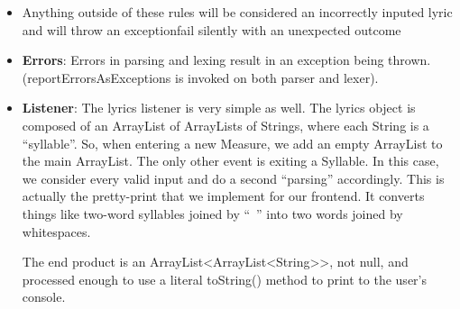 \documentclass[12pt]{book}
\begin{document}
\begin{itemize}
\item Anything outside of these rules will be considered an incorrectly inputed
lyric and will throw an exception\/fail silently with an unexpected outcome

\item {\bf Errors}: Errors in parsing and lexing result in an exception being thrown. (reportErrorsAsExceptions is invoked on both parser and lexer).

\item {\bf Listener}: The lyrics listener is very simple as well. The lyrics object is composed of an ArrayList of ArrayLists of Strings, where each String is a ``syllable''. So, when entering a new Measure, we add an empty ArrayList to the main ArrayList. The only other event is exiting a Syllable. In this case, we consider every valid input and do a second ``parsing'' accordingly. This is actually the pretty-print that we implement for our frontend. It converts things like two-word syllables joined by ``~'' into two words joined by whitespaces.

The end product is an ArrayList<ArrayList<String>>, not null, and processed enough to use a literal toString() method to print to the user's console.
\end{itemize}
\bigskip
{}
\end{document}
